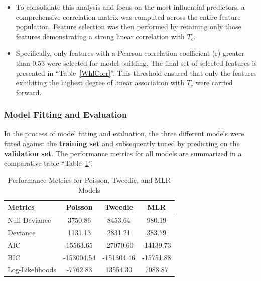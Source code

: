 \documentclass[conference]{IEEEtran}
\begin{document}
\begin{itemize}
	\item To consolidate this analysis and focus on the most influential predictors, a comprehensive correlation matrix was computed across the entire feature population. Feature selection was then performed by retaining only those features demonstrating a strong linear correlation with $T_c$.
	\item Specifically, only features with a Pearson correlation coefficient (r) greater than 0.53 were selected for model building. The final set of selected features is presented in ``Table~\ref{WhlCorr}''. This threshold ensured that only the features exhibiting the highest degree of linear association with $T_c$ were carried forward.\\
\end{itemize}



\subsubsection{\textbf{Model Fitting and Evaluation}}

In the process of model fitting and evaluation, the three different models were fitted against the \textbf{training set} and subsequently tuned by predicting on the \textbf{validation set}. The performance metrics for all models are summarized in a comparative table ``Table~\ref{model_comparison_basic}''.

\begin{table}[h]
	\centering
	\caption{Performance Metrics for Poisson, Tweedie, and MLR Models}
	\label{model_comparison_basic}
	\begin{tabular}{|l|c|c|c|}
		\hline
		\textbf{Metrics} & \textbf{Poisson} & \textbf{Tweedie} & \textbf{MLR} \\
		\hline
		Null Deviance    & 3750.86 & 8453.64 & 980.19 \\
		\hline
		Deviance         & 1131.13 & 2831.21 & 383.79 \\
		\hline
		AIC              & 15563.65 & -27070.60 & -14139.73 \\
		\hline
		BIC              & -153004.54 & -151304.46 & -15751.88 \\
		\hline
		Log-Likelihoods  & -7762.83 & 13554.30 & 7088.87 \\
		\hline
	\end{tabular}
\end{table}
\end{document}
